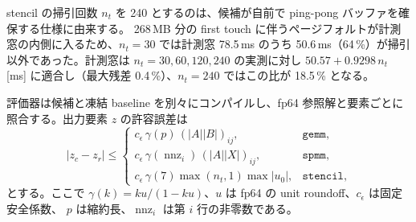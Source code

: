 \documentclass[conference,letterpaper]{IEEEtran}
\begin{document}
stencil の掃引回数 $n_t$ を 240 とするのは、候補が自前で ping-pong バッファを確保する仕様に由来する。
268\,MB 分の first touch に伴うページフォルトが計測窓の内側に入るため、$n_t=30$ では計測窓 78.5\,ms のうち
50.6\,ms（64\,\%）が掃引以外であった。計測窓は $n_t=30,60,120,240$ の実測に対し $50.57 + 0.9298\,n_t$ [ms]
に適合し（最大残差 0.4\,\%）、$n_t=240$ ではこの比が 18.5\,\% となる。

評価器は候補と凍結 baseline を別々にコンパイルし、fp64 参照解と要素ごとに照合する。出力要素 $z$ の許容誤差は
\begin{equation*}
 |z_c-z_r|\le
 \begin{cases}
 c_\epsilon\,\gamma(p)\,(|A||B|)_{ij}, & \texttt{gemm},\\
 c_\epsilon\,\gamma(\operatorname{nnz}_i)\,(|A||X|)_{ij}, & \texttt{spmm},\\
 c_\epsilon\,\gamma(7)\max(n_t,1)\max|u_0|, & \texttt{stencil},
 \end{cases}
\end{equation*}
とする。ここで $\gamma(k)=ku/(1-ku)$、$u$ は fp64 の unit roundoff、$c_\epsilon$ は固定安全係数、
$p$ は縮約長、$\operatorname{nnz}_i$ は第 $i$ 行の非零数である。
\end{document}
